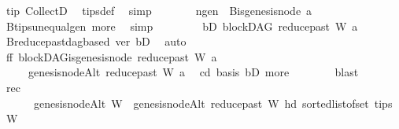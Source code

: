 \begin{isabellebody}
\ tip\ CollectD\ \isamarkupfalse%
\ tips{\isacharunderscore}{\kern0pt}def\ \isamarkupfalse%
\ simp\isanewline
\ \ \ \ \isamarkupfalse%
\ \isamarkupfalse%
\ n{\isacharunderscore}{\kern0pt}gen{\isacharcolon}{\kern0pt}\ {\isachardoublequoteopen}{\isasymnot}\ B{\isachardot}{\kern0pt}is{\isacharunderscore}{\kern0pt}genesis{\isacharunderscore}{\kern0pt}node\ a{\isachardoublequoteclose}\isanewline
\ \ \ \ \ \ \isamarkupfalse%
\ B{\isachardot}{\kern0pt}tips{\isacharunderscore}{\kern0pt}unequal{\isacharunderscore}{\kern0pt}gen\ more\ \isamarkupfalse%
\ simp\ \isanewline
\ \ \ \ \isamarkupfalse%
\ \isamarkupfalse%
\ bD{}{\isacharcolon}{\kern0pt}\ {\isachardoublequoteopen}blockDAG\ {\isacharparenleft}{\kern0pt}reduce{\isacharunderscore}{\kern0pt}past\ W\ a{\isacharparenright}{\kern0pt}{\isachardoublequoteclose}\isanewline
\ \ \ \ \ \ \isamarkupfalse%
\ B{\isachardot}{\kern0pt}reduce{\isacharunderscore}{\kern0pt}past{\isacharunderscore}{\kern0pt}dagbased\ ver\ bD\ \isamarkupfalse%
\ auto\isanewline
\ \ \ \ \isamarkupfalse%
\ ff{\isacharcolon}{\kern0pt}\ {\isachardoublequoteopen}blockDAG{\isachardot}{\kern0pt}is{\isacharunderscore}{\kern0pt}genesis{\isacharunderscore}{\kern0pt}node\ {\isacharparenleft}{\kern0pt}reduce{\isacharunderscore}{\kern0pt}past\ W\ a{\isacharparenright}{\kern0pt}\isanewline
\ \ \ \ \ {\isacharparenleft}{\kern0pt}genesis{\isacharunderscore}{\kern0pt}nodeAlt\ {\isacharparenleft}{\kern0pt}reduce{\isacharunderscore}{\kern0pt}past\ W\ a{\isacharparenright}{\kern0pt}{\isacharparenright}{\kern0pt}{\isachardoublequoteclose}\ \isamarkupfalse%
\ cd{}\ basis\ bD{}\ more\isanewline
\ \ \ \ \ \ \isamarkupfalse%
\ blast\isanewline
\ \ \ \ \isamarkupfalse%
\ rec{\isacharcolon}{\kern0pt}\ \isanewline
\ \ \ \ \ \ {\isachardoublequoteopen}genesis{\isacharunderscore}{\kern0pt}nodeAlt\ W\ {\isacharequal}{\kern0pt}\ genesis{\isacharunderscore}{\kern0pt}nodeAlt\ {\isacharparenleft}{\kern0pt}reduce{\isacharunderscore}{\kern0pt}past\ W\ {\isacharparenleft}{\kern0pt}hd\ {\isacharparenleft}{\kern0pt}sorted{\isacharunderscore}{\kern0pt}list{\isacharunderscore}{\kern0pt}of{\isacharunderscore}{\kern0pt}set\ {\isacharparenleft}{\kern0pt}tips\ W{\isacharparenright}{\kern0pt}{\isacharparenright}{\kern0pt}{\isacharparenright}{\kern0pt}{\isacharparenright}{\kern0pt}{\isachardoublequoteclose}\isanewline
\ \ \ \ \ \ \isamarkupfalse%

\end{isabellebody}
